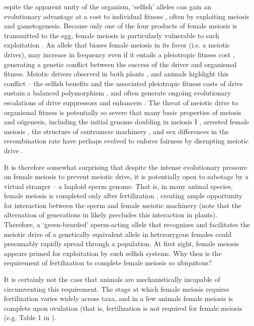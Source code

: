 \documentclass{pnastwo}
\begin{document}
\begin{article}
espite the apparent unity of the organism, `selfish' alleles can
gain an evolutionary advantage at a cost to  individual fitness
\cite{Burt2006}, often by exploiting meiosis and gametogenesis.
Because only one of the four products of female meiosis is transmitted to the egg, female meiosis is particularly vulnerable to such exploitation \cite{Sandler1957,Pardo-ManuelDeVillena2001a}. 
An allele that biases female meiosis in its favor (i.e. a meiotic driver), may increase in frequency even if it entails a pleiotropic fitness cost \cite{Prout1973}, generating a genetic conflict between the success of the driver and organismal fitness.
Meiotic drivers observed in both plants
\cite{Buckler1999,Fishman2005,Fishman2008}, and animals
\cite{Agulnik1990,Wu2005,Pardo-ManuelDeVillena2001c} highlight this
conflict -- the selfish benefits and the associated
pleiotropic fitness costs of drive sustain a balanced polymorphism
\cite{Prout1973}, 
and often generate ongoing evolutionary escalations of drive suppressors and enhancers \cite{Dawe1996,Fishman2008}. 
The threat of meiotic drive to organismal fitness is potentially so
severe that many basic properties of
meiosis and o\"{o}genesis, including the initial genome doubling in
meiosis I \cite{Haig1991}, arrested female meiosis
\cite{Mira1998}, the structure of centromere machinery \cite{Malik2002a,Malik2009}, and sex differences in the recombination rate \cite{Haig2010,Brandvain2012} 
have perhaps evolved to enforce fairness by disrupting meiotic drive \cite{Rice2013}.




It is therefore somewhat surprising that despite the intense evolutionary pressure on female meiosis to prevent meiotic drive, 
it is potentially open to sabotage by a virtual stranger -- a haploid sperm genome.
That is, in many animal species, female meiosis is completed only after fertilization \cite{Masui_book}, 
	creating ample opportunity for interaction between the sperm and
	female meiotic machinery (note that the alternation of generations in
	likely precludes this interaction in plants). 
Therefore, a `green-bearded' \cite{Gardner2010} sperm-acting allele that recognizes and facilitates the meiotic drive of a genetically equivalent allele in heterozygous females 
     could presumably rapidly spread through a population. 
At first sight, female meiosis appears primed for exploitation by such selfish systems.  
Why then is the requirement of fertilization to complete female meiosis so ubiquitous? 

It is certainly not the case that animals are mechanistically incapable of circumventing this requirement.
The stage at which female meiosis requires fertilization varies widely across taxa, and in a few animals  
	female meiosis is complete upon ovulation (that is, fertilization is not required for female meiosis (e.g. Table 1 in \cite {Masui_book}). 


\end{article}
\end{document}
